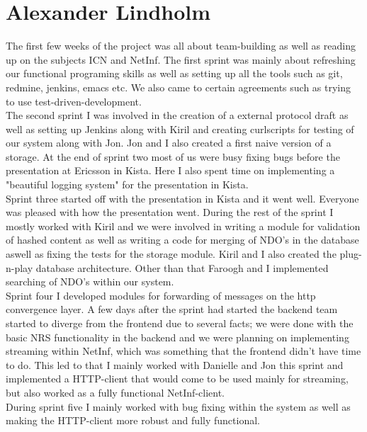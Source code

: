 \section{Alexander Lindholm}
The first few weeks of the project was all about team-building as well as reading up on the subjects ICN and NetInf. The first sprint was mainly about refreshing our functional programing skills as well as setting up all the tools such as git, redmine, jenkins, emacs etc. We also came to certain agreements such as trying to use test-driven-development. \\

The second sprint I was involved in the creation of a external protocol draft as well as setting up Jenkins along with Kiril and creating curlscripts for testing of our system along with Jon. Jon and I also created a first naive version of a storage. At the end of sprint two most of us were busy fixing bugs before the presentation at Ericsson in Kista. Here I also spent time on implementing a "beautiful logging system" for the presentation in Kista.\\

Sprint three started off with the presentation in Kista and it went well. Everyone was pleased with how the presentation went. During the rest of the sprint I mostly worked with Kiril and we were involved in writing a module for validation of hashed content as well as writing a code for merging of NDO's in the database aswell as fixing the tests for the storage module. Kiril and I also created the plug-n-play database architecture. Other than that Faroogh and I implemented searching of NDO's within our system.\\

Sprint four I developed modules for forwarding of messages on the http convergence layer.
A few days after the sprint had started the backend team started to diverge from the frontend due to several facts;
we were done with the basic NRS functionality in the backend and we were planning on implementing streaming within NetInf, which was something that the frontend didn't have time to do. 
This led to that I mainly worked with Danielle and Jon this sprint and implemented a HTTP-client that would come to be used mainly for streaming, but also worked as a fully functional NetInf-client. \\

During sprint five I mainly worked with bug fixing within the system as well as making the HTTP-client more robust and fully functional.\\

